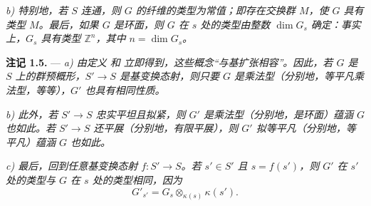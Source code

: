 \textit{b) 特别地，若 \(S\) 连通，则 \(G\) 的纤维的类型为常值；即存在交换群 \(M\)，使 \(G\) 具有类型 \(M\)。最后，如果 \(G\) 是环面，则 \(G\) 在 \(s\) 处的类型由整数 \(\dim G_s\) 确定：事实上，\(G_s\) 具有类型 \(\mathbb Z^n\)，其中 \(n=\dim G_s\)。}

\medskip
\noindent{}\textbf{注记 1.5.} ---
\textit{a) 由定义  和  立即得到，这些概念“与基扩张相容”。因此，若 \(G\) 是 \(S\) 上的群预概形，\(S'\to S\) 是基变换态射，则只要 \(G\) 是乘法型（分别地，等平凡乘法型，等等），\(G'\) 也具有相同性质。}

\textit{b) 此外，若 \(S'\to S\) 忠实平坦且拟紧，则 \(G'\) 是乘法型（分别地，是环面）蕴涵 \(G\) 也如此。若 \(S'\to S\) 还平展（分别地，有限平展），则 \(G'\) 拟等平凡（分别地，等平凡）蕴涵 \(G\) 也如此。}

\textit{c) 最后，回到任意基变换态射 \(f:S'\to S\)。若 \(s'\in S'\) 且 \(s=f(s')\)，则 \(G'\) 在 \(s'\) 处的类型与 \(G\) 在 \(s\) 处的类型相同，因为
\[
  G'_{s'}=G_s\otimes_{\kappa(s)}\kappa(s').
\]}